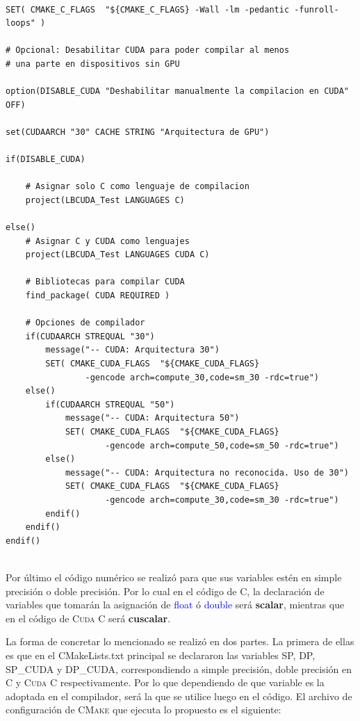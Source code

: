 {\scriptsize
	\begin{frame}{}
		\begin{lstlisting}[frame=single]

SET( CMAKE_C_FLAGS  "${CMAKE_C_FLAGS} -Wall -lm -pedantic -funroll-loops" )

# Opcional: Desabilitar CUDA para poder compilar al menos
# una parte en dispositivos sin GPU

option(DISABLE_CUDA "Deshabilitar manualmente la compilacion en CUDA" OFF)

set(CUDAARCH "30" CACHE STRING "Arquitectura de GPU")

if(DISABLE_CUDA)

	# Asignar solo C como lenguaje de compilacion
	project(LBCUDA_Test LANGUAGES C)

else()
	# Asignar C y CUDA como lenguajes
	project(LBCUDA_Test LANGUAGES CUDA C)
	
	# Bibliotecas para compilar CUDA
	find_package( CUDA REQUIRED )

	# Opciones de compilador
	if(CUDAARCH STREQUAL "30")
		message("-- CUDA: Arquitectura 30")
		SET( CMAKE_CUDA_FLAGS  "${CMAKE_CUDA_FLAGS} 
				-gencode arch=compute_30,code=sm_30 -rdc=true")
	else()
		if(CUDAARCH STREQUAL "50")
			message("-- CUDA: Arquitectura 50")      
			SET( CMAKE_CUDA_FLAGS  "${CMAKE_CUDA_FLAGS} 
					-gencode arch=compute_50,code=sm_50 -rdc=true")
		else()
			message("-- CUDA: Arquitectura no reconocida. Uso de 30")
			SET( CMAKE_CUDA_FLAGS  "${CMAKE_CUDA_FLAGS} 
					-gencode arch=compute_30,code=sm_30 -rdc=true")      
		endif()
	endif()
endif()
		
		\end{lstlisting}
		
	\end{frame}
}

Por último el código numérico se realizó para que sus variables estén en simple precisión o doble precisión. Por lo cual en el código de \textsc{C}, la declaración de variables que tomarán la asignación de \textcolor{blue}{float} ó \textcolor{blue}{double} será \textbf{scalar}, mientras que en el código de \textsc{Cuda C} será \textbf{cuscalar}. 

La forma de concretar lo mencionado se realizó en dos partes. La primera de ellas es que en el CMakeLists.txt principal se declararon las variables SP, DP, SP\_CUDA y DP\_CUDA, correspondiendo a simple precisión, doble precisión en \textsc{C} y \textsc{Cuda C} respectivamente. Por lo que dependiendo de que variable es la adoptada en el compilador, será la que se utilice luego en el código. El archivo de configuración de \textsc{CMake} que ejecuta lo propuesto es el siguiente:

